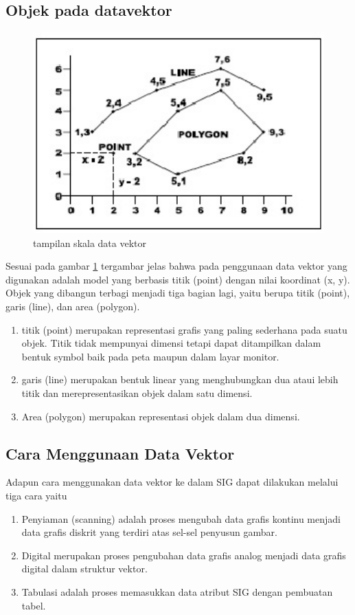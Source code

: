 \subsection {Objek pada datavektor}
\begin{figure}[ht]
\centerline{\includegraphics[width=1\textwidth] {figures/vektor02.jpg}}
\caption{tampilan skala data vektor}
\label{vektor02}
\end{figure}
Sesuai pada gambar \ref{vektor02} tergambar jelas bahwa pada penggunaan data vektor yang digunakan adalah model yang berbasis titik (point) dengan nilai koordinat (x, y).
Objek yang dibangun terbagi menjadi tiga bagian lagi, yaitu berupa titik (point), garis (line), dan area (polygon). 
\begin{enumerate}
\item titik (point) merupakan representasi grafis yang paling sederhana pada suatu objek. Titik tidak mempunyai dimensi tetapi dapat ditampilkan dalam bentuk symbol baik pada peta maupun dalam layar monitor.
\item garis (line) merupakan bentuk linear yang menghubungkan dua ataui lebih titik dan merepresentasikan objek dalam satu dimensi. 
\item Area (polygon) merupakan representasi objek dalam dua dimensi.
\end{enumerate}

\subsection { Cara Menggunaan Data Vektor}
Adapun cara menggunakan data vektor ke dalam SIG dapat dilakukan melalui tiga cara yaitu 
\begin{enumerate}
\item Penyiaman (scanning) adalah proses mengubah data grafis kontinu menjadi data grafis diskrit yang terdiri atas sel-sel penyusun gambar.
\item Digital merupakan proses pengubahan data grafis analog menjadi data grafis digital dalam struktur vektor.
\item Tabulasi adalah proses memasukkan data atribut SIG dengan pembuatan tabel.
\end{enumerate}

